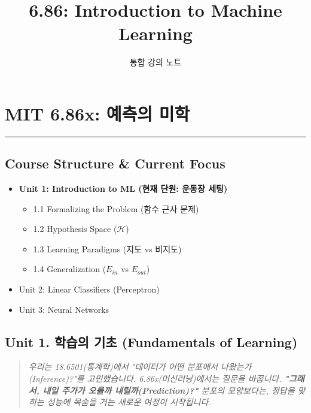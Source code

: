 \documentclass[11pt,a4paper]{book}
\title{\textbf{6.86: Introduction to Machine Learning}}
\author{통합 강의 노트}
\date{}
\theoremstyle{definition}
\begin{document}
\maketitle
\tableofcontents


\chapter{MIT 6.86x: 예측의 미학}
\label{ch:lecture1}


\vspace{1cm}
\hrule
\vspace{1cm}

\section*{Course Structure \& Current Focus}
\begin{itemize}
    \item \textbf{\textcolor{mainblue}{Unit 1: Introduction to ML (현재 단원: 운동장 세팅)}}
    \begin{itemize}
        \item 1.1 Formalizing the Problem (함수 근사 문제)
        \item 1.2 Hypothesis Space ($\mathcal{H}$)
        \item 1.3 Learning Paradigms (지도 vs 비지도)
        \item 1.4 Generalization ($E_{in}$ vs $E_{out}$)
    \end{itemize}
    \item Unit 2: Linear Classifiers (Perceptron)
    \item Unit 3: Neural Networks
\end{itemize}


\section{Unit 1. 학습의 기초 (Fundamentals of Learning)}

\begin{quote}
\textit{우리는 18.6501(통계학)에서 "데이터가 어떤 분포에서 나왔는가(Inference)?"를 고민했습니다. 6.86x(머신러닝)에서는 질문을 바꿉니다. \textbf{"그래서, 내일 주가가 오를까 내릴까(Prediction)?"} 분포의 모양보다는, 정답을 맞히는 성능에 목숨을 거는 새로운 여정이 시작됩니다.}
\end{quote}
\end{document}
